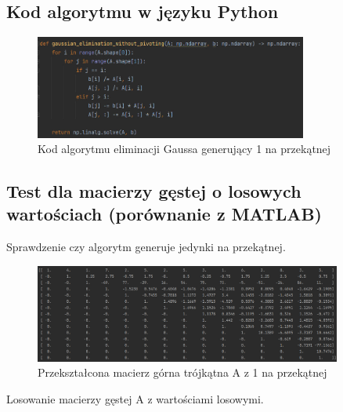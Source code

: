 \documentclass[9pt]{article}
\begin{document}
\subsection{Kod algorytmu w języku Python}

\begin{figure}[h]
  \centering
  \includegraphics[width=0.8\textwidth]{gaussian_elimination_without_pivoting.jpg}
  \caption{Kod algorytmu eliminacji Gaussa generujący 1 na przekątnej}
\end{figure}

\subsection{Test dla macierzy gęstej o losowych wartościach (porównanie z MATLAB)}

Sprawdzenie czy algorytm generuje jedynki na przekątnej.

\begin{figure}[h]
  \centering
  \includegraphics[width=0.9\textwidth]{ones_on_diagonal.jpg}
  \caption{Przekształcona macierz górna trójkątna A z 1 na przekątnej}
\end{figure}

Losowanie macierzy gęstej A z wartościami losowymi.
\end{document}
